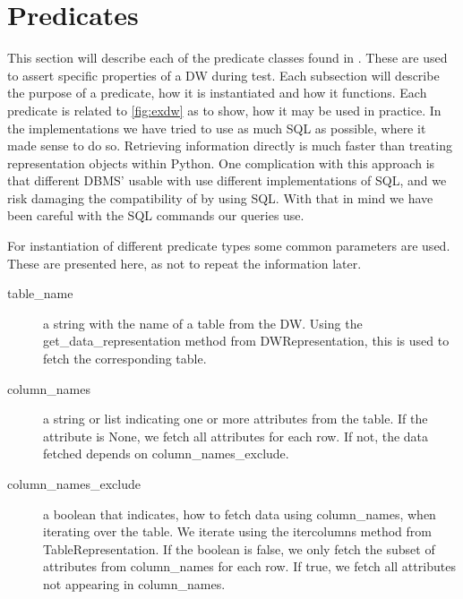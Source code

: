 \section{Predicates}\label{sect:pred}
This section will describe each of the predicate classes found in \FW. These are used to assert specific properties of a DW during test. Each subsection will describe the purpose of a predicate, how it is instantiated and how it functions. Each predicate is related to \cref{fig:exdw} as to show, how it may be used in practice. In the implementations we have tried to use as much SQL as possible, where it made sense to do so. Retrieving information directly is much faster than treating representation objects within Python. One complication with this approach is that different DBMS' usable
with \FW{} use different implementations of SQL, and we risk damaging the compatibility of \FW{} by using SQL. With that in mind we have been careful with the SQL commands our queries use.

For instantiation of different predicate types some common parameters are used. These are presented here, as not to repeat the information later.
\begin{description}
\item [table\_name] a string with the name of a table from the DW. Using the get\_data\_representation method from DWRepresentation, this is used to fetch the corresponding table.
\item [column\_names] a string or list indicating one or more attributes from the table. If the attribute is None, we fetch all attributes for each row. If not, the data fetched depends on column\_names\_exclude.
\item [column\_names\_exclude] a boolean that indicates, how to fetch data using column\_names, when iterating over the table. We iterate using the itercolumns method from TableRepresentation. If the boolean is false, we only fetch the subset of attributes from column\_names for each row. If true, we fetch all attributes not appearing in column\_names.
\end{description}












